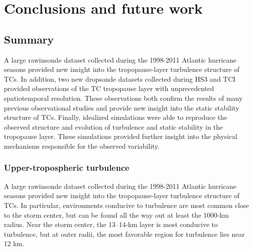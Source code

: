  
\chapter{Conclusions and future work}
\label{chapter:conclusions}
\resetfootnote %

\section{Summary}

A large rawinsonde dataset collected during the 1998-2011 Atlantic hurricane seasons provided new insight into the tropopause-layer turbulence structure of TCs.
In addition, two new dropsonde datasets collected during HS3 and TCI provided observations of the TC tropopause layer with unprecedented spatiotemporal resolution.
These observations both confirm the results of many previous observational studies and provide new insight into the static stability structure of TCs.
Finally, idealized simulations were able to reproduce the observed structure and evolution of turbulence and static stability in the tropopause layer.
These simulations provided further insight into the physical mechanisms responsible for the observed variability.

\subsection{Upper-tropospheric turbulence}
A large rawinsonde dataset collected during the 1998-2011 Atlantic hurricane seasons provided new insight into the tropopause-layer turbulence structure of TCs.
In particular, environments conducive to turbulence are most common close to the storm center, but can be found all the way out at least the 1000-km radius.
Near the storm center, the 13--14-km layer is most conducive to turbulence, but at outer radii, the most favorable region for turbulence lies near 12 km.

